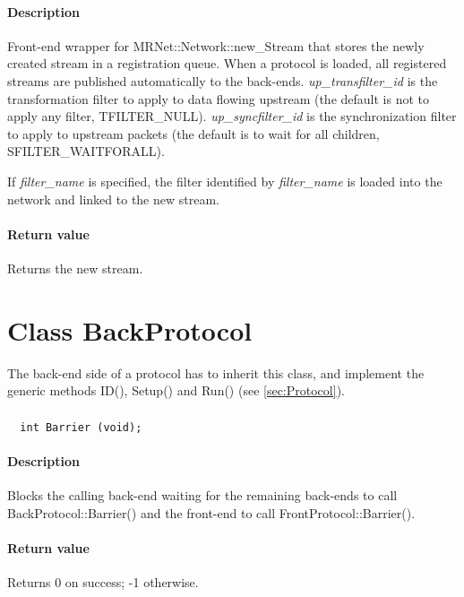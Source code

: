 \documentclass[twoside,a4,english,11pt]{book}
\begin{document}
\paragraph{Description}
  Front-end wrapper for MRNet::Network::new\_Stream that stores the newly created stream in a registration queue.
  When a protocol is loaded, all registered streams are published automatically to the back-ends.
  \emph{up\_transfilter\_id} is the transformation filter to apply to data flowing upstream (the default is 
  not to apply any filter, TFILTER\_NULL). \emph{up\_syncfilter\_id} is the synchronization filter to apply 
  to upstream packets (the default is to wait for all children, SFILTER\_WAITFORALL).

  If \emph{filter\_name} is specified, the filter identified by \emph{filter\_name} is loaded into the network and linked 
  to the new stream.

\paragraph{Return value}
  Returns the new stream.  
      

\section{Class BackProtocol}
  The back-end side of a protocol has to inherit this class, and implement the generic methods ID(), Setup() and Run()
  (see \ref{sec:Protocol}). 

\subsubsection{}
\begin{lstlisting}
  int Barrier (void);
\end{lstlisting}

\paragraph{Description}
  Blocks the calling back-end waiting for the remaining back-ends to call BackProtocol::Barrier() and the front-end to call FrontProtocol::Barrier().
  
\paragraph{Return value}
  Returns 0 on success; -1 otherwise.
  
\end{document}
